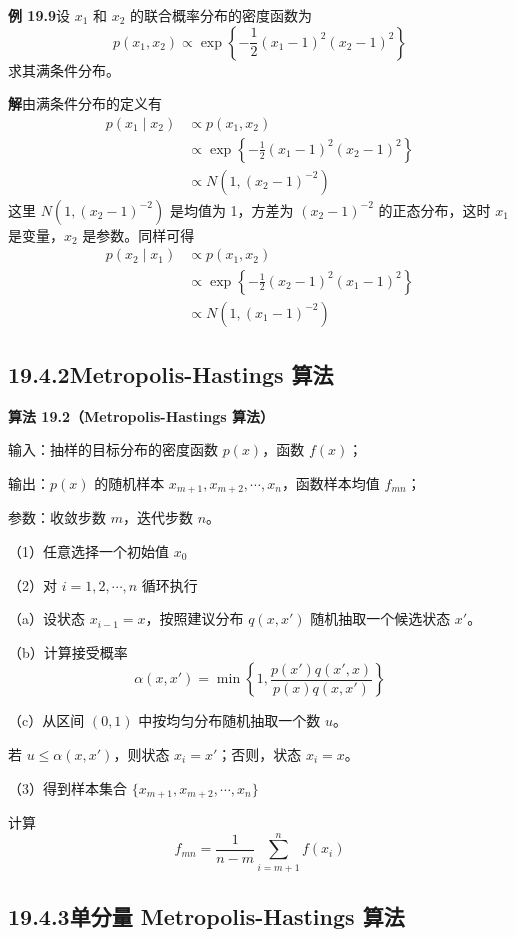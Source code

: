 \documentclass[UTF8, 12pt, fontset=fandol, oneside]{ctexart}
\begin{document}
\noindent\textbf{例 19.9}\quad 设 $x_1$ 和 $x_2$ 的联合概率分布的密度函数为
\[
p(x_1,x_2)\propto \exp\left\{-\frac{1}{2}(x_1-1)^2(x_2-1)^2\right\}
\]
求其满条件分布。

\noindent\textbf{解}\quad 由满条件分布的定义有
\[
\begin{aligned}
p(x_1\mid x_2)&\propto p(x_1,x_2)\\
&\propto \exp\left\{-\frac{1}{2}(x_1-1)^2(x_2-1)^2\right\}\\
&\propto N(1,(x_2-1)^{-2})
\end{aligned}
\]
这里 $N(1,(x_2-1)^{-2})$ 是均值为 1，方差为 $(x_2-1)^{-2}$ 的正态分布，这时 $x_1$ 是变量，$x_2$ 是参数。同样可得
\[
\begin{aligned}
p(x_2\mid x_1)&\propto p(x_1,x_2)\\
&\propto \exp\left\{-\frac{1}{2}(x_2-1)^2(x_1-1)^2\right\}\\
&\propto N(1,(x_1-1)^{-2})
\end{aligned}
\]

\subsection*{19.4.2\quad Metropolis-Hastings 算法}

\noindent\textbf{算法 19.2（Metropolis-Hastings 算法）}

输入：抽样的目标分布的密度函数 $p(x)$，函数 $f(x)$；

输出：$p(x)$ 的随机样本 $x_{m+1},x_{m+2},\cdots,x_n$，函数样本均值 $f_{mn}$；

参数：收敛步数 $m$，迭代步数 $n$。

（1）任意选择一个初始值 $x_0$

（2）对 $i=1,2,\cdots,n$ 循环执行

（a）设状态 $x_{i-1}=x$，按照建议分布 $q(x,x')$ 随机抽取一个候选状态 $x'$。

（b）计算接受概率
\[
\alpha(x,x')=\min\left\{1,\frac{p(x')q(x',x)}{p(x)q(x,x')}\right\}
\]

（c）从区间 $(0,1)$ 中按均匀分布随机抽取一个数 $u$。

若 $u\leqslant \alpha(x,x')$，则状态 $x_i=x'$；否则，状态 $x_i=x$。

（3）得到样本集合 $\{x_{m+1},x_{m+2},\cdots,x_n\}$

计算
\[
f_{mn}=\frac{1}{n-m}\sum_{i=m+1}^{n}f(x_i)
\]

\subsection*{19.4.3\quad 单分量 Metropolis-Hastings 算法}
\end{document}
